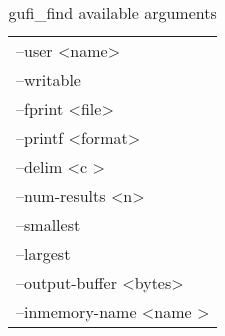 \begin{table} [h]
\begin{tabular}{l}
--user \textless name\textgreater\\
--writable\\
--fprint \textless file\textgreater\\
--printf \textless format\textgreater\\
--delim \textless c \textgreater\\
--num-results \textless n\textgreater\\
--smallest\\
--largest\\
--output-buffer \textless bytes\textgreater\\
--inmemory-name \textless name \textgreater
\end{tabular}
\caption{\label{fig:gufi_find_arguments}gufi\_find available arguments}
\end{table}
